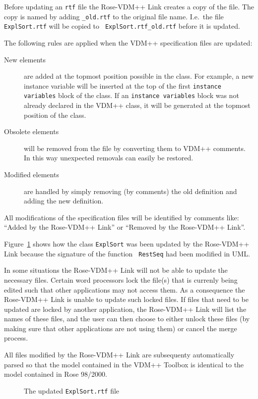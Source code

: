 \documentclass[\pformat,12pt]{article}
\newcommand{\vdmpp}{VDM++}
\newcommand{\ToolboxName}{\vdmpp{} Toolbox}
\newcommand{\link}{Rose-\vdmpp{} Link}
\newcommand{\rose}{Rose 98/2000}
\begin{document}
Before updating an {\tt rtf} file the \link{} creates a copy of the
file. The copy is named by adding {\tt \_old.rtf} to the original file
name. I.e.\ the file {\tt ExplSort.rtf} will be copied to {\tt
  ExplSort.rtf\_old.rtf} before it is updated.

The following rules are applied when the \vdmpp{} specification files
are updated:
\begin{description}
\item[New elements] are added at the topmost position possible in the
  class.  For example, a new instance variable will be inserted at
  the top of the first {\tt instance variables} block of the class. If
  an {\tt instance variables} block was not already declared in the
  \vdmpp{} class, it will be generated at the topmost position of the
  class.
\item[Obsolete elements] will be removed from the file by converting
  them to \vdmpp{} comments. In this way unexpected removals can
  easily be restored.
\item[Modified elements] are handled by simply removing (by comments)
  the old definition and adding the new definition.
\end{description}
All modifications of the specification files will be identified by
comments like: ``Added by the Rose-VDM++ Link'' or ``Removed by the
Rose-VDM++ Link''.

Figure~\ref{fig:update} shows how the class {\tt ExplSort} was been
updated by the \link{} because the signature of the function {\tt
  RestSeq} had been modified in UML.

In some situations the \link{} will not be able to update the
necessary files.  Certain word processors lock the file(s) that is
currenly being edited such that other applications may not access
them. As a consequence the \link{} is unable to update such locked
files. If files that need to be updated are locked by another
application, the \link{} will list the names of these files, and the
user can then choose to either unlock these files (by making sure that
other applications are not using them) or cancel the merge process.

All files modified by the \link{} are subsequenty automatically parsed
so that the model contained in the \ToolboxName{} is identical to the
model contained in \rose{}.

\begin{figure}[htb]
\begin{center}
\mbox{}
\caption{The updated {\tt ExplSort.rtf} file\label{fig:update}}
\end{center}
\end{figure}
\end{document}
